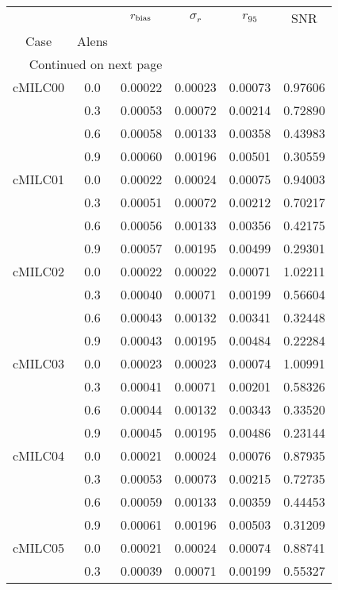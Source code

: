 \begin{longtable}{cccccc}
\toprule
        &     &  $r_{\rm bias}$  &  $\sigma_r$ &  $r_{95}$ &     SNR \\
Case & Alens &                  &             &           &         \\
\midrule
\endhead
\midrule
\multicolumn{3}{r}{{Continued on next page}} \\
\midrule
\endfoot

\bottomrule
\endlastfoot
cMILC00 & 0.0 & 0.00022 & 0.00023 & 0.00073 & 0.97606 \\
        & 0.3 & 0.00053 & 0.00072 & 0.00214 & 0.72890 \\
        & 0.6 & 0.00058 & 0.00133 & 0.00358 & 0.43983 \\
        & 0.9 & 0.00060 & 0.00196 & 0.00501 & 0.30559 \\
cMILC01 & 0.0 & 0.00022 & 0.00024 & 0.00075 & 0.94003 \\
        & 0.3 & 0.00051 & 0.00072 & 0.00212 & 0.70217 \\
        & 0.6 & 0.00056 & 0.00133 & 0.00356 & 0.42175 \\
        & 0.9 & 0.00057 & 0.00195 & 0.00499 & 0.29301 \\
cMILC02 & 0.0 & 0.00022 & 0.00022 & 0.00071 & 1.02211 \\
        & 0.3 & 0.00040 & 0.00071 & 0.00199 & 0.56604 \\
        & 0.6 & 0.00043 & 0.00132 & 0.00341 & 0.32448 \\
        & 0.9 & 0.00043 & 0.00195 & 0.00484 & 0.22284 \\
cMILC03 & 0.0 & 0.00023 & 0.00023 & 0.00074 & 1.00991 \\
        & 0.3 & 0.00041 & 0.00071 & 0.00201 & 0.58326 \\
        & 0.6 & 0.00044 & 0.00132 & 0.00343 & 0.33520 \\
        & 0.9 & 0.00045 & 0.00195 & 0.00486 & 0.23144 \\
cMILC04 & 0.0 & 0.00021 & 0.00024 & 0.00076 & 0.87935 \\
        & 0.3 & 0.00053 & 0.00073 & 0.00215 & 0.72735 \\
        & 0.6 & 0.00059 & 0.00133 & 0.00359 & 0.44453 \\
        & 0.9 & 0.00061 & 0.00196 & 0.00503 & 0.31209 \\
cMILC05 & 0.0 & 0.00021 & 0.00024 & 0.00074 & 0.88741 \\
        & 0.3 & 0.00039 & 0.00071 & 0.00199 & 0.55327 \\

\end{longtable}

